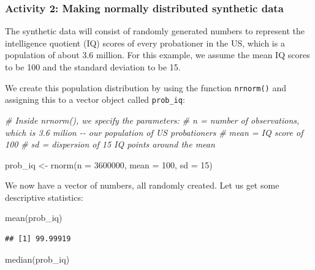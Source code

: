 \documentclass[
]{book}
\newenvironment{Shaded}{\begin{snugshade}}{\end{snugshade}}
\newcommand{\AttributeTok}[1]{\textcolor[rgb]{0.77,0.63,0.00}{#1}}
\newcommand{\CommentTok}[1]{\textcolor[rgb]{0.56,0.35,0.01}{\textit{#1}}}
\newcommand{\DecValTok}[1]{\textcolor[rgb]{0.00,0.00,0.81}{#1}}
\newcommand{\FunctionTok}[1]{\textcolor[rgb]{0.00,0.00,0.00}{#1}}
\newcommand{\NormalTok}[1]{#1}
\newcommand{\OtherTok}[1]{\textcolor[rgb]{0.56,0.35,0.01}{#1}}
\begin{document}
\hypertarget{activity-2-making-normally-distributed-synthetic-data}{%
\subsubsection{Activity 2: Making normally distributed synthetic data}\label{activity-2-making-normally-distributed-synthetic-data}}

The synthetic data will consist of randomly generated numbers to represent the intelligence quotient (IQ) scores of every probationer in the US, which is a population of about 3.6 million. For this example, we assume the mean IQ scores to be 100 and the standard deviation to be 15.

We create this population distribution by using the function \texttt{nrnorm()} and assigning this to a vector object called \texttt{prob\_iq}:

\begin{Shaded}
\begin{Highlighting}[]
\CommentTok{\# Inside nrnorm(), we specify the parameters:}
\CommentTok{\# n = number of observations, which is 3.6 milion {-}{-} our population of US probationers}
\CommentTok{\# mean = IQ score of 100}
\CommentTok{\# sd = dispersion of 15 IQ points around the mean}

\NormalTok{prob\_iq }\OtherTok{\textless{}{-}} \FunctionTok{rnorm}\NormalTok{(}\AttributeTok{n =} \DecValTok{3600000}\NormalTok{, }\AttributeTok{mean =} \DecValTok{100}\NormalTok{, }\AttributeTok{sd =} \DecValTok{15}\NormalTok{)}
\end{Highlighting}
\end{Shaded}

We now have a vector of numbers, all randomly created. Let us get some descriptive statistics:

\begin{Shaded}
\begin{Highlighting}[]
\FunctionTok{mean}\NormalTok{(prob\_iq) }
\end{Highlighting}
\end{Shaded}

\begin{verbatim}
## [1] 99.99919
\end{verbatim}

\begin{Shaded}
\begin{Highlighting}[]
\FunctionTok{median}\NormalTok{(prob\_iq) }
\end{Highlighting}
\end{Shaded}
\end{document}
